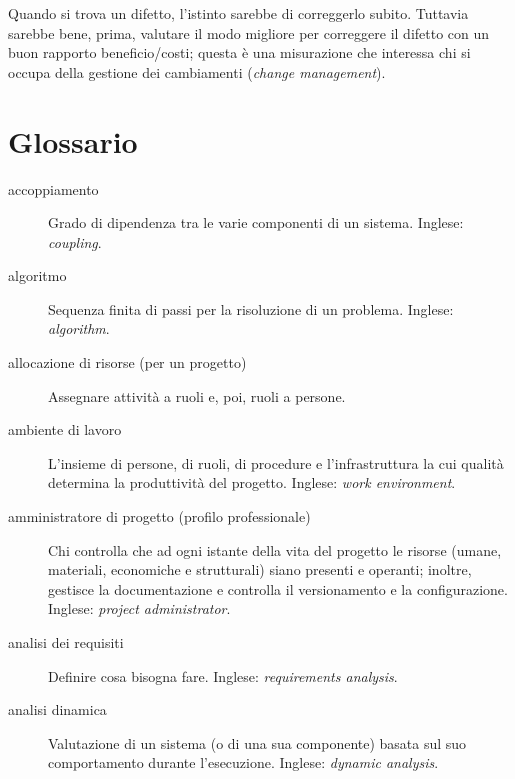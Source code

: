 \documentclass[a4paper]{article}
\begin{document}
Quando si trova un difetto, l'istinto sarebbe di correggerlo subito. Tuttavia sarebbe bene, prima, valutare il modo migliore per correggere il difetto con un buon rapporto beneficio/costi; questa è una misurazione che interessa chi si occupa della gestione dei cambiamenti (\emph{change management}).
	


		
	\newpage
	\appendix
	\section{Glossario}


		
	\begin{description}
		
			
	\item[accoppiamento] 

			Grado di dipendenza tra le varie componenti di un sistema. Inglese: \emph{coupling}.
			
	\item[algoritmo] 

			Sequenza finita di passi per la risoluzione di un problema. Inglese: \emph{algorithm}.
			
	\item[allocazione di risorse (per un progetto)] 

			Assegnare attività a ruoli e, poi, ruoli a persone.
			
	\item[ambiente di lavoro] 

			L'insieme di persone, di ruoli, di procedure e l'infrastruttura la cui qualità determina la produttività del progetto. Inglese: \emph{work environment}.
			
	\item[amministratore di progetto (profilo professionale)] 

			Chi controlla che ad ogni istante della vita del progetto le risorse (umane, materiali, economiche e strutturali) siano presenti e operanti; inoltre, gestisce la documentazione e controlla il versionamento e la configurazione. Inglese: \emph{project administrator}.
			
	\item[analisi dei requisiti] 

			Definire cosa bisogna fare. Inglese: \emph{requirements analysis}.
			
	\item[analisi dinamica] 

			Valutazione di un sistema (o di una sua componente) basata sul suo comportamento durante l'esecuzione. Inglese: \emph{dynamic analysis}.
			

\end{description}
\end{document}
